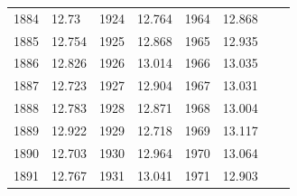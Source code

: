 \begin{description}[noitemsep]
\begin{description}[noitemsep]
\begin{table}
\begin{center}
\begin{xtabular}[t]{|l|l|l|l|l|l|l|l|}
        	1884	 &
        	12.73	 &
        	1924	 &
        	12.764	 &
        	1964	 &
        	12.868	 &
        		 &
     \tabularnewline{}
        	1885	 &
        	12.754	 &
        	1925	 &
        	12.868	 &
        	1965	 &
        	12.935	 &
        		 &
     \tabularnewline{}
        	1886	 &
        	12.826	 &
        	1926	 &
        	13.014	 &
        	1966	 &
        	13.035	 &
        		 &
     \tabularnewline{}
        	1887	 &
        	12.723	 &
        	1927	 &
        	12.904	 &
        	1967	 &
        	13.031	 &
        		 &
     \tabularnewline{}
        	1888	 &
        	12.783	 &
        	1928	 &
        	12.871	 &
        	1968	 &
        	13.004	 &
        		 &
     \tabularnewline{}
        	1889	 &
        	12.922	 &
        	1929	 &
        	12.718	 &
        	1969	 &
        	13.117	 &
        		 &
     \tabularnewline{}
        	1890	 &
        	12.703	 &
        	1930	 &
        	12.964	 &
        	1970	 &
        	13.064	 &
        		 &
     \tabularnewline{}
        	1891	 &
        	12.767	 &
        	1931	 &
        	13.041	 &
        	1971	 &
        	12.903	 &
        		 &

\end{xtabular}
\end{center}
\end{table}
\end{description}
\end{description}
